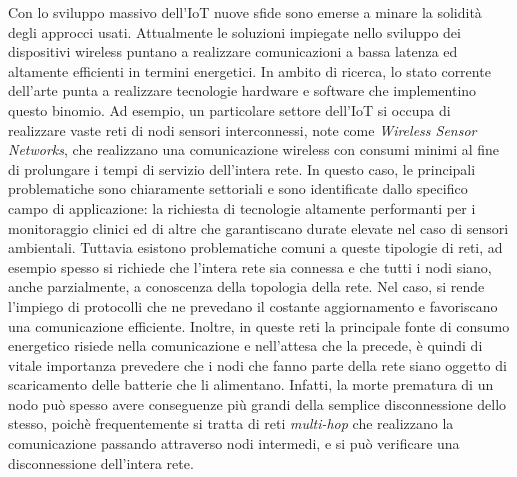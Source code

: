 \documentclass[binding=0.6cm,TFA]{sapthesis}
\begin{document}
Con lo sviluppo massivo dell'IoT nuove sfide sono emerse a minare la solidità degli approcci usati. Attualmente le soluzioni impiegate nello sviluppo
dei dispositivi wireless puntano a realizzare comunicazioni a bassa latenza ed altamente efficienti in termini energetici. In ambito di ricerca,
lo stato corrente dell'arte punta a realizzare tecnologie hardware e software che implementino questo binomio. Ad esempio, un particolare
settore dell'IoT si occupa di realizzare vaste reti di nodi sensori interconnessi, note come \emph{Wireless Sensor Networks}, 
che realizzano una comunicazione wireless con consumi minimi al fine di prolungare i tempi di servizio dell'intera rete. In questo caso,
le principali problematiche sono chiaramente settoriali e sono identificate dallo specifico campo di applicazione: la richiesta di tecnologie
altamente performanti per i monitoraggio clinici ed di altre che garantiscano durate elevate nel caso di sensori ambientali. Tuttavia esistono
problematiche comuni a queste tipologie di reti, ad esempio spesso si richiede che l'intera rete sia connessa e che tutti i nodi siano,
anche parzialmente, a conoscenza della topologia della rete. Nel caso, si rende l'impiego di protocolli che ne prevedano il
costante aggiornamento e favoriscano una comunicazione efficiente. Inoltre, in queste reti la principale fonte di consumo energetico risiede
nella comunicazione e nell'attesa che la precede, è quindi di vitale importanza prevedere che i nodi che fanno parte della rete siano
oggetto di scaricamento delle batterie che li alimentano. Infatti, la morte prematura di un nodo può spesso avere conseguenze più grandi della semplice
disconnessione dello stesso, poichè frequentemente si tratta di reti \emph{multi-hop} che realizzano la comunicazione passando attraverso nodi intermedi, e si può
verificare una disconnessione dell'intera rete.\\
\end{document}
